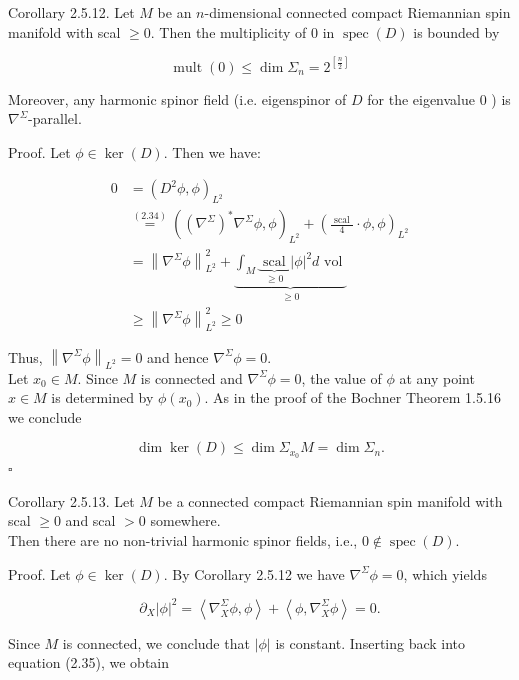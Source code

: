 \documentclass[10pt, letterpaper]{article}
\begin{document}
Corollary 2.5.12. Let $M$ be an $n$-dimensional connected compact Riemannian spin manifold with scal $\geq 0$. Then the multiplicity of 0 in $\operatorname{spec}(D)$ is bounded by

$$
\operatorname{mult}(0) \leq \operatorname{dim} \Sigma_{n}=2^{\left[\frac{n}{2}\right]}
$$

Moreover, any harmonic spinor field (i.e. eigenspinor of $D$ for the eigenvalue 0 ) is $\nabla^{\Sigma}$-parallel.

Proof. Let $\phi \in \operatorname{ker}(D)$. Then we have:

$$
\begin{aligned}
0 & =\left(D^{2} \phi, \phi\right)_{L^{2}} \\
& \stackrel{(2.34)}{=}\left(\left(\nabla^{\Sigma}\right)^{*} \nabla^{\Sigma} \phi, \phi\right)_{L^{2}}+\left(\frac{\text { scal }}{4} \cdot \phi, \phi\right)_{L^{2}} \\
& =\left\|\nabla^{\Sigma} \phi\right\|_{L^{2}}^{2}+\underbrace{\int_{M} \underbrace{\text { scal }}_{\geq 0}|\phi|^{2} d \text { vol }}_{\geq 0} \\
& \geq\left\|\nabla^{\Sigma} \phi\right\|_{L^{2}}^{2} \geq 0
\end{aligned}
$$

Thus, $\left\|\nabla^{\Sigma} \phi\right\|_{L^{2}}=0$ and hence $\nabla^{\Sigma} \phi=0$.\\
Let $x_{0} \in M$. Since $M$ is connected and $\nabla^{\Sigma} \phi=0$, the value of $\phi$ at any point $x \in M$ is determined by $\phi\left(x_{0}\right)$. As in the proof of the Bochner Theorem 1.5.16 we conclude

$$
\operatorname{dim} \operatorname{ker}(D) \leq \operatorname{dim} \Sigma_{x_{0}} M=\operatorname{dim} \Sigma_{n} .
$$ \(\square\)

Corollary 2.5.13. Let $M$ be a connected compact Riemannian spin manifold with scal $\geq 0$ and scal $>0$ somewhere.\\
Then there are no non-trivial harmonic spinor fields, i.e., $0 \notin \operatorname{spec}(D)$.

Proof. Let $\phi \in \operatorname{ker}(D)$. By Corollary 2.5.12 we have $\nabla^{\Sigma} \phi=0$, which yields

$$
\partial_{X}|\phi|^{2}=\left\langle\nabla_{X}^{\Sigma} \phi, \phi\right\rangle+\left\langle\phi, \nabla_{X}^{\Sigma} \phi\right\rangle=0 .
$$

Since $M$ is connected, we conclude that $|\phi|$ is constant. Inserting back into equation (2.35), we obtain
\end{document}
